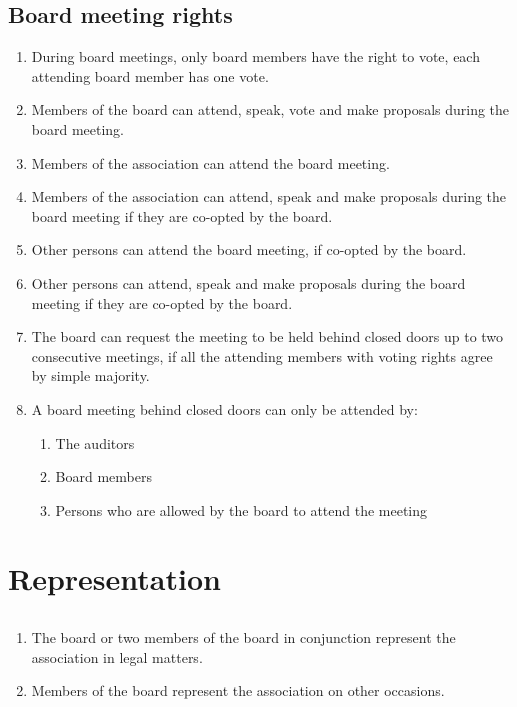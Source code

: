 \subsection{Board meeting rights}
\begin{enumerate}
  \item During board meetings, only board members have the right to vote, each attending board member has one vote.
  \item Members of the board can attend, speak, vote and make proposals during the board meeting.
  \item Members of the association can attend the board meeting.
  \item Members of the association can attend, speak and make proposals during the board meeting if they are co-opted by the board.
  \item Other persons can attend the board meeting, if co-opted by the board.
  \item Other persons can attend, speak and make proposals during the board meeting if they are co-opted by the board.
  \item The board can request the meeting to be held behind closed doors up to two consecutive meetings, if all the attending members with voting rights agree by simple majority.
  \item A board meeting behind closed doors can only be attended by: 
  \begin{enumerate}
    \item The auditors 
    \item Board members 
    \item Persons who are allowed by the board to attend the meeting
  \end{enumerate}
\end{enumerate}

\section*{Representation}
\subsection{}
\begin{enumerate}
  \item The board or two members of the board in conjunction represent the association in legal matters.
  \item Members of the board represent the association on other occasions.
\end{enumerate}

